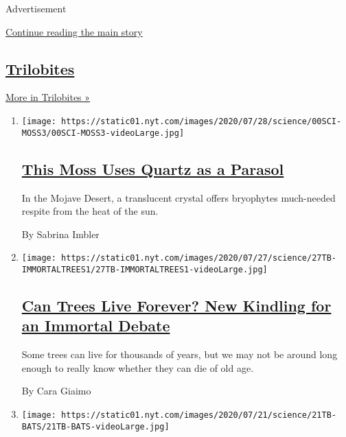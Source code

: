 Advertisement

\protect\hyperlink{after-mid1}{Continue reading the main story}

\hypertarget{trilobites-2}{%
\subsection{\texorpdfstring{\href{/column/trilobites}{Trilobites}}{Trilobites}}\label{trilobites-2}}

\href{/column/trilobites}{More in Trilobites »}

\begin{enumerate}
\def\labelenumi{\arabic{enumi}.}
\item
  \texttt{[image: https://static01.nyt.com/images/2020/07/28/science/00SCI-MOSS3/00SCI-MOSS3-videoLarge.jpg]}

  \hypertarget{this-moss-uses-quartz-as-a-parasol}{%
  \subsection{\texorpdfstring{\href{/2020/07/29/science/moss-quartz-biology-syntrichia.html}{This
  Moss Uses Quartz as a
  Parasol}}{This Moss Uses Quartz as a Parasol}}\label{this-moss-uses-quartz-as-a-parasol}}

  In the Mojave Desert, a translucent crystal offers bryophytes
  much-needed respite from the heat of the sun.

  By Sabrina Imbler
\item
  \texttt{[image: https://static01.nyt.com/images/2020/07/27/science/27TB-IMMORTALTREES1/27TB-IMMORTALTREES1-videoLarge.jpg]}

  \hypertarget{can-trees-live-forever-new-kindling-for-an-immortal-debate}{%
  \subsection{\texorpdfstring{\href{/2020/07/27/science/trees-immortality.html}{Can
  Trees Live Forever? New Kindling for an Immortal
  Debate}}{Can Trees Live Forever? New Kindling for an Immortal Debate}}\label{can-trees-live-forever-new-kindling-for-an-immortal-debate}}

  Some trees can live for thousands of years, but we may not be around
  long enough to really know whether they can die of old age.

  By Cara Giaimo
\item
  \texttt{[image: https://static01.nyt.com/images/2020/07/21/science/21TB-BATS/21TB-BATS-videoLarge.jpg]}


\end{enumerate}
